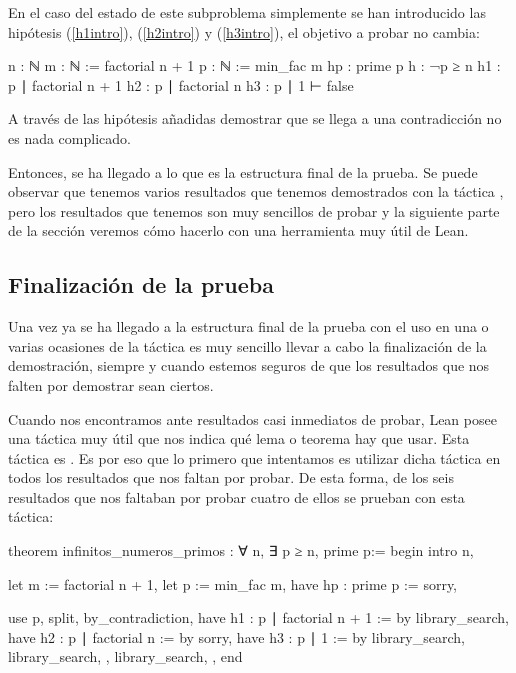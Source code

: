 En el caso del estado de este subproblema simplemente se han introducido las
hipótesis (\ref{h1intro}), (\ref{h2intro}) y (\ref{h3intro}), el objetivo a
probar no cambia:
\begin{leancode}
n : ℕ
m : ℕ := factorial n + 1
p : ℕ := min_fac m
hp : prime p
h : ¬p ≥ n
h1 : p ∣ factorial n + 1
h2 : p ∣ factorial n
h3 : p ∣ 1
⊢ false
\end{leancode}

A través de las hipótesis añadidas demostrar que se llega a una
contradicción no es nada complicado.

Entonces, se ha llegado a lo que es la estructura final de la prueba. Se
puede observar que tenemos varios resultados que tenemos demostrados con
la táctica , pero los resultados que tenemos son
muy sencillos de probar y la siguiente parte de la sección veremos cómo
hacerlo con una herramienta muy útil de Lean.

\subsection{Finalización de la prueba}

Una vez ya se ha llegado a la estructura final de la prueba con el uso
en una o varias ocasiones de la táctica  es muy
sencillo llevar a cabo la finalización de la demostración, siempre y
cuando estemos seguros de que los resultados que nos falten por
demostrar sean ciertos.

Cuando nos encontramos ante resultados casi inmediatos de probar, Lean
posee una táctica muy útil que nos indica qué lema o teorema hay que
usar. Esta táctica es . Es por
eso que lo primero que intentamos es utilizar dicha táctica en todos los
resultados que nos faltan por probar. De esta forma, de los seis
resultados que nos faltaban por probar cuatro de ellos se prueban con
esta táctica:
\begin{leancode}
theorem infinitos_numeros_primos : ∀ n, ∃ p ≥ n, prime p:=
begin
  intro n,

  let m := factorial n + 1,
  let p := min_fac m,
  have hp : prime p := sorry,

  use p,
  split,
  { by_contradiction,
    have h1 : p ∣ factorial n + 1 := by library_search,
    have h2 : p ∣ factorial n := by sorry,
    have h3 : p ∣ 1 := by library_search,
    library_search, },
  { library_search, },
end
\end{leancode}


